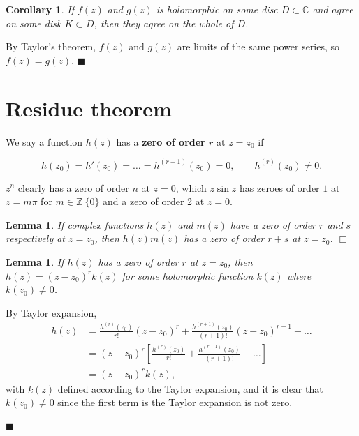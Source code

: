 \documentclass[letter-paper]{tufte-book}
\newtheorem{lemma}[theorem]{\color{pastel-blue}Lemma}
\newtheorem{corollary}[theorem]{\color{pastel-blue}Corollary}
\newenvironment{proof}[1][Proof]{\begin{trivlist}
\item[\hskip \labelsep {\bfseries #1}]}{\end{trivlist}}
\newenvironment{example}[1][Example]{\begin{trivlist}
\item[\hskip \labelsep {\bfseries #1}]}{\end{trivlist}}
\newcommand\Def[1]{\textbf{#1}}
\newcommand{\qed}{\hfill$\blacksquare$}
\newcommand{\qedwhite}{\hfill \ensuremath{\Box}}
\begin{document}
\begin{corollary}
  If $f(z)$ and $g(z)$ is holomorphic on some disc $D \subset \mathbb{C}$ and
  agree on some disk $K \subset D$, then they agree on the whole of $D$.
\end{corollary}
\begin{proof}
  By Taylor's theorem, $f(z)$ and $g(z)$ are limits of the same power series, so
  $f(z) = g(z)$. \qed
\end{proof}


\section{Residue theorem}

We say a function $h(z)$ has a \Def{zero of order $r$} at $z=z_0$ if

\begin{equation*}
  h(z_0) = h'(z_0) = \ldots = h^{(r-1)}(z_0) = 0, \qquad h^{(r)}(z_0) \neq 0.
\end{equation*}

\begin{example}
  $z^n$ clearly has a zero of order $n$ at $z = 0$, which $z \sin z$ has zeroes
  of order $1$ at $z = m \pi$ for $m \in \mathbb{Z} \ \{0\}$ and a zero of order
  2 at $z = 0$.
\end{example}

\begin{lemma}
  If complex functions $h(z)$ and $m(z)$ have a zero of order $r$ and $s$
  respectively at $z=z_0$, then $h(z)m(z)$ has a zero of order $r + s$ at
  $z=z_0$. \qedwhite {}
\end{lemma}

\begin{lemma}
  If $h(z)$ has a zero of order $r$ at $z=z_0$, then $h(z) = (z-z_0)^r k(z)$ for
  some holomorphic function $k(z)$ where $k(z_0) \neq 0$.
\end{lemma}

\begin{proof}
  By Taylor expansion,
  \begin{align*}
    h(z) &= \frac{h^{(r)}(z_0)}{r!} (z-z_0)^r + \frac{h^{(r+1)}(z_0)}{(r+1)!} (z-z_0)^{r+1} + \ldots\\
      &= (z-z_0)^r \left[\frac{h^{(r)}(z_0)}{r!} + \frac{h^{(r+1)}(z_0)}{(r+1)!} + \ldots\right]\\
      &=(z-z_0)^r k(z),
  \end{align*}
  with $k(z)$ defined according to the Taylor expansion, and it is clear that
  $k(z_0) \neq 0$ since the first term is the Taylor expansion is not zero. 
  
  \qed
\end{proof}
\end{document}
